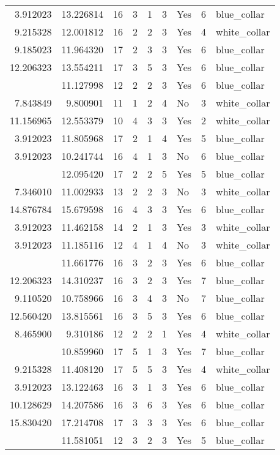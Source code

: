 \documentclass[
]{article}
\begin{document}
\begin{longtable}[t]{rrrrrllrl}
3.912023 & 13.226814 & 16 & 3 & 1 & 3 & Yes & 6 & blue\_collar\\
9.215328 & 12.001812 & 16 & 2 & 2 & 3 & Yes & 4 & white\_collar\\
9.185023 & 11.964320 & 17 & 2 & 3 & 3 & Yes & 6 & blue\_collar\\
12.206323 & 13.554211 & 17 & 3 & 5 & 3 & Yes & 6 & blue\_collar\\
\addlinespace
7.346010 & 11.127998 & 12 & 2 & 2 & 3 & Yes & 6 & blue\_collar\\
7.843849 & 9.800901 & 11 & 1 & 2 & 4 & No & 3 & white\_collar\\
11.156965 & 12.553379 & 10 & 4 & 3 & 3 & Yes & 2 & white\_collar\\
3.912023 & 11.805968 & 17 & 2 & 1 & 4 & Yes & 5 & blue\_collar\\
3.912023 & 10.241744 & 16 & 4 & 1 & 3 & No & 6 & blue\_collar\\
\addlinespace
11.225910 & 12.095420 & 17 & 2 & 2 & 5 & Yes & 5 & blue\_collar\\
7.346010 & 11.002933 & 13 & 2 & 2 & 3 & No & 3 & white\_collar\\
14.876784 & 15.679598 & 16 & 4 & 3 & 3 & Yes & 6 & blue\_collar\\
3.912023 & 11.462158 & 14 & 2 & 1 & 3 & Yes & 3 & white\_collar\\
3.912023 & 11.185116 & 12 & 4 & 1 & 4 & No & 3 & white\_collar\\
\addlinespace
6.476972 & 11.661776 & 16 & 3 & 2 & 3 & Yes & 6 & blue\_collar\\
12.206323 & 14.310237 & 16 & 3 & 2 & 3 & Yes & 7 & blue\_collar\\
9.110520 & 10.758966 & 16 & 3 & 4 & 3 & No & 7 & blue\_collar\\
12.560420 & 13.815561 & 16 & 3 & 5 & 3 & Yes & 6 & blue\_collar\\
8.465900 & 9.310186 & 12 & 2 & 2 & 1 & Yes & 4 & white\_collar\\
\addlinespace
3.912023 & 10.859960 & 17 & 5 & 1 & 3 & Yes & 7 & blue\_collar\\
9.215328 & 11.408120 & 17 & 5 & 5 & 3 & Yes & 4 & white\_collar\\
3.912023 & 13.122463 & 16 & 3 & 1 & 3 & Yes & 6 & blue\_collar\\
10.128629 & 14.207586 & 16 & 3 & 6 & 3 & Yes & 6 & blue\_collar\\
15.830420 & 17.214708 & 17 & 3 & 3 & 3 & Yes & 6 & blue\_collar\\
\addlinespace
10.128629 & 11.581051 & 12 & 3 & 2 & 3 & Yes & 5 & blue\_collar\\

\end{longtable}
\end{document}
